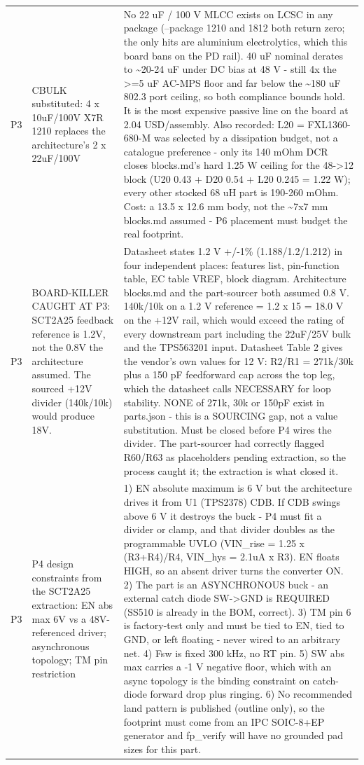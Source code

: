 \documentclass[11pt,a4paper]{article}
\begin{document}
{\begin{longtable}{lp{5.2cm}p{7.2cm}}
P3 & CBULK substituted: 4 x 10uF/100V X7R 1210 replaces the architecture's 2 x 22uF/100V & No 22 uF / 100 V MLCC exists on LCSC in any package (--package 1210 and 1812 both return zero; the only hits are aluminium electrolytics, which this board bans on the PD rail). 40 uF nominal derates to \textasciitilde{}20-24 uF under DC bias at 48 V - still 4x the \textgreater{}=5 uF AC-MPS floor and far below the \textasciitilde{}180 uF 802.3 port ceiling, so both compliance bounds hold. It is the most expensive passive line on the board at 2.04 USD/assembly. Also recorded: L20 = FXL1360-680-M was selected by a dissipation budget, not a catalogue preference - only its 140 mOhm DCR closes blocks.md's hard 1.25 W ceiling for the 48-\textgreater{}12 block (U20 0.43 + D20 0.54 + L20 0.245 = 1.22 W); every other stocked 68 uH part is 190-260 mOhm. Cost: a 13.5 x 12.6 mm body, not the \textasciitilde{}7x7 mm blocks.md assumed - P6 placement must budget the real footprint. \\
P3 & BOARD-KILLER CAUGHT AT P3: SCT2A25 feedback reference is 1.2V, not the 0.8V the architecture assumed. The sourced +12V divider (140k/10k) would produce 18V. & Datasheet states 1.2 V +/-1\% (1.188/1.2/1.212) in four independent places: features list, pin-function table, EC table VREF, block diagram. Architecture blocks.md and the part-sourcer both assumed 0.8 V. 140k/10k on a 1.2 V reference = 1.2 x 15 = 18.0 V on the +12V rail, which would exceed the rating of every downstream part including the 22uF/25V bulk and the TPS563201 input. Datasheet Table 2 gives the vendor's own values for 12 V: R2/R1 = 271k/30k plus a 150 pF feedforward cap across the top leg, which the datasheet calls NECESSARY for loop stability. NONE of 271k, 30k or 150pF exist in parts.json - this is a SOURCING gap, not a value substitution. Must be closed before P4 wires the divider. The part-sourcer had correctly flagged R60/R63 as placeholders pending extraction, so the process caught it; the extraction is what closed it. \\
P3 & P4 design constraints from the SCT2A25 extraction: EN abs max 6V vs a 48V-referenced driver; asynchronous topology; TM pin restriction & 1) EN absolute maximum is 6 V but the architecture drives it from U1 (TPS2378) CDB. If CDB swings above 6 V it destroys the buck - P4 must fit a divider or clamp, and that divider doubles as the programmable UVLO (VIN\_rise = 1.25 x (R3+R4)/R4, VIN\_hys = 2.1uA x R3). EN floats HIGH, so an absent driver turns the converter ON. 2) The part is an ASYNCHRONOUS buck - an external catch diode SW-\textgreater{}GND is REQUIRED (SS510 is already in the BOM, correct). 3) TM pin 6 is factory-test only and must be tied to EN, tied to GND, or left floating - never wired to an arbitrary net. 4) Fsw is fixed 300 kHz, no RT pin. 5) SW abs max carries a -1 V negative floor, which with an async topology is the binding constraint on catch-diode forward drop plus ringing. 6) No recommended land pattern is published (outline only), so the footprint must come from an IPC SOIC-8+EP generator and fp\_verify will have no grounded pad sizes for this part. \\

\end{longtable}}
\end{document}
